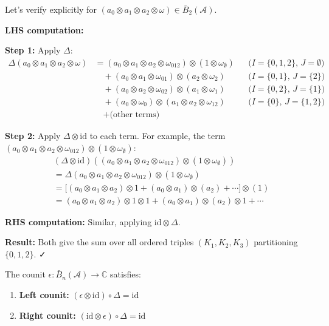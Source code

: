 \begin{example}[Coassociativity for $n=2$]\label{ex:coassoc-n2}
Let's verify explicitly for $(a_0 \otimes a_1 \otimes a_2 \otimes \omega) \in \bar{B}_2(\mathcal{A})$.

\textbf{LHS computation:}

\textbf{Step 1:} Apply $\Delta$:
\begin{align*}
\Delta(a_0 \otimes a_1 \otimes a_2 \otimes \omega) 
&= (a_0 \otimes a_1 \otimes a_2 \otimes \omega_{012}) \otimes (1 \otimes \omega_{\emptyset}) && \text{($I=\{0,1,2\}$, $J=\emptyset$)} \\
&\quad + (a_0 \otimes a_1 \otimes \omega_{01}) \otimes (a_2 \otimes \omega_2) && \text{($I=\{0,1\}$, $J=\{2\}$)} \\
&\quad + (a_0 \otimes a_2 \otimes \omega_{02}) \otimes (a_1 \otimes \omega_1) && \text{($I=\{0,2\}$, $J=\{1\}$)} \\
&\quad + (a_0 \otimes \omega_0) \otimes (a_1 \otimes a_2 \otimes \omega_{12}) && \text{($I=\{0\}$, $J=\{1,2\}$)} \\
&\quad + \text{(other terms)}
\end{align*}

\textbf{Step 2:} Apply $\Delta \otimes \text{id}$ to each term. For example, the term $(a_0 \otimes a_1 \otimes a_2 \otimes \omega_{012}) \otimes (1 \otimes \omega_{\emptyset})$:
\begin{align*}
&(\Delta \otimes \text{id})\left((a_0 \otimes a_1 \otimes a_2 \otimes \omega_{012}) \otimes (1 \otimes \omega_{\emptyset})\right) \\
&= \Delta(a_0 \otimes a_1 \otimes a_2 \otimes \omega_{012}) \otimes (1 \otimes \omega_{\emptyset}) \\
&= \Big[(a_0 \otimes a_1 \otimes a_2) \otimes 1 + (a_0 \otimes a_1) \otimes (a_2) + \cdots\Big] \otimes (1) \\
&= (a_0 \otimes a_1 \otimes a_2) \otimes 1 \otimes 1 + (a_0 \otimes a_1) \otimes (a_2) \otimes 1 + \cdots
\end{align*}

\textbf{RHS computation:} Similar, applying $\text{id} \otimes \Delta$.

\textbf{Result:} Both give the sum over all ordered triples $(K_1, K_2, K_3)$ partitioning $\{0,1,2\}$. ✓
\end{example}

\begin{theorem}\label{thm:counit-axioms}
The counit $\epsilon: \bar{B}_n(\mathcal{A}) \to \mathbb{C}$ satisfies:
\begin{enumerate}
\item \textbf{Left counit:} $(\epsilon \otimes \text{id}) \circ \Delta = \text{id}$
\item \textbf{Right counit:} $(\text{id} \otimes \epsilon) \circ \Delta = \text{id}$
\end{enumerate}
\end{theorem}

